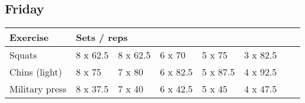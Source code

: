 \documentclass[12pt, a4paper]{article}%
\begin{document}
  \subsection*{\hspace{0.5em} Friday }


  \begin{tabular}{l|lllllll}
  \hspace{0.75em} \textbf{Exercise} & \multicolumn{ 7 }{l}{ \textbf{Sets / reps} } \\ \hline

            \hspace{0.75em} Squats
            & 8 x 62.5
            & 8 x 62.5
            & 6 x 70
            & 5 x 75
            & 3 x 82.5
            & 
            & 
            \\


            \hspace{0.75em} Chins (light)
            & 8 x 75
            & 7 x 80
            & 6 x 82.5
            & 5 x 87.5
            & 4 x 92.5
            & 
            & 
            \\


            \hspace{0.75em} Military press
            & 8 x 37.5
            & 7 x 40
            & 6 x 42.5
            & 5 x 45
            & 4 x 47.5
            & 
            & 
            \\


  \end{tabular}
\end{document}
